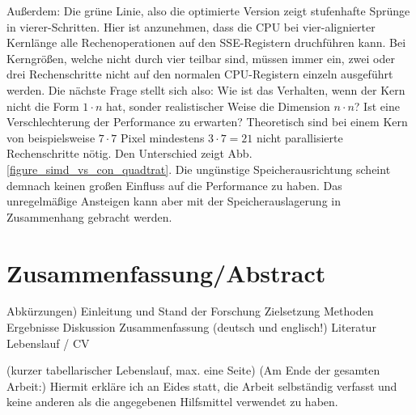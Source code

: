 \documentclass[a4paper,12pt]{article}
\begin{document}
Außerdem: Die grüne Linie, also die optimierte Version zeigt stufenhafte
Sprünge in vierer-Schritten. Hier ist anzunehmen, dass die CPU bei
vier-alignierter Kernlänge alle Rechenoperationen auf den SSE-Registern
druchführen kann. Bei Kerngrößen, welche nicht durch vier teilbar sind, müssen
immer ein, zwei oder drei Rechenschritte nicht auf den normalen CPU-Registern
einzeln ausgeführt werden. Die nächste Frage stellt sich also: Wie ist das
Verhalten, wenn der Kern nicht die Form $1 \cdot n$ hat, sonder realistischer
Weise die Dimension $n \cdot n$? Ist eine Verschlechterung der Performance zu
erwarten? Theoretisch sind bei einem Kern von beispielsweise $7 \cdot 7$ Pixel
mindestens $3 \cdot 7 = 21$ nicht parallisierte Rechenschritte nötig. Den
Unterschied zeigt Abb. \ref{figure_simd_vs_con_quadtrat}. Die ungünstige
Speicherausrichtung scheint demnach keinen großen Einfluss auf die Performance
zu haben. Das unregelmäßige Ansteigen kann aber mit der Speicherauslagerung in
Zusammenhang gebracht werden.
 
\section{Zusammenfassung/Abstract}

\newpage
\listoffigures 
{} 

\newpage
\listoftables
{} 

\lstlistoflistings

\newpage




\newpage 
{}

Abkürzungen)
Einleitung und Stand der Forschung
Zielsetzung
Methoden
Ergebnisse
Diskussion
Zusammenfassung
(deutsch und englisch!)
Literatur
Lebenslauf / CV

(kurzer tabellarischer Lebenslauf, max. eine Seite)
(Am Ende der gesamten Arbeit:)
Hiermit erkläre ich an Eides statt, die Arbeit selbständig verfasst und keine anderen
als die angegebenen Hilfsmittel verwendet zu haben.


\end{document}
